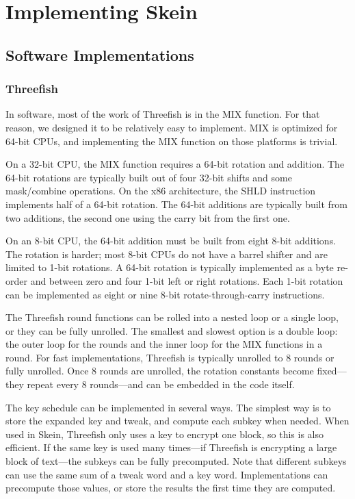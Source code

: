 \documentclass[11pt,twoside]{article}
\begin{document}
\section{Implementing Skein}

\subsection{Software Implementations}

\subsubsection{Threefish}

In software, most of the work of Threefish is in the MIX function.  For that reason, we designed it to be relatively easy to implement.  MIX is optimized for 64-bit CPUs, and implementing the MIX function on those platforms is trivial.

On a 32-bit CPU, the MIX function requires a 64-bit rotation and addition. The 64-bit rotations are typically built out of four 32-bit shifts and some mask/combine operations.  On the x86 architecture, the SHLD instruction implements half of a 64-bit rotation.  The 64-bit additions are typically built from two additions, the second one using the carry bit from the first one.

On an 8-bit CPU, the 64-bit addition must be built from eight 8-bit additions. The rotation is harder; most 8-bit CPUs do not have a barrel shifter and are limited to 1-bit rotations.  A 64-bit rotation is typically implemented as a byte re-order and between zero and four 1-bit left or right rotations. Each 1-bit rotation can be implemented as eight or nine 8-bit rotate-through-carry instructions.

The Threefish round functions can be rolled into a nested loop or a single loop, or they can be fully unrolled.  The smallest and slowest option is a double loop: the outer loop for the rounds and the inner loop for the MIX functions in a round.  For fast implementations, Threefish is typically unrolled to 8 rounds or fully unrolled.  Once 8 rounds are unrolled, the rotation constants become fixed---they repeat every 8 rounds---and can be embedded in the code itself.

The key schedule can be implemented in several ways. The simplest way is to store the expanded key and tweak, and compute each subkey when needed.  When used in Skein, Threefish only uses a key to encrypt one block, so this is also efficient.  If the same key is used many times---if Threefish is encrypting a large block of text---the subkeys can be fully precomputed.  Note that different subkeys can use the same sum of a tweak word and a key word. Implementations can precompute those values, or store the results the first time they are computed.
\end{document}

